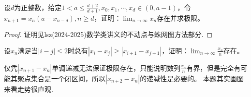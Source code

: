 \documentclass[../../main.tex]{subfiles}%
\begin{document}
\begin{example}
设\(d\)为正整数，给定\(1 < a\leqslant \frac{d + 2}{d + 1},x_0,x_1,\cdots,x_d\in(0,a - 1)\)，令\(x_{n + 1}=x_n(a - x_{n - d}),n\geqslant  d\)，证明：\(\lim_{n\rightarrow\infty}x_n\)存在并求极限。
\end{example}
\begin{proof}

证明见lsz(2024-2025)数学类讲义的不动点与蛛网图方法部分.

\end{proof}



\begin{example}
设\(x_n\)满足当\(|i - j|\leqslant 2\)时总有\(|x_i - x_j|\geqslant |x_{i + 1}-x_{j + 1}|\)，证明：\(\lim_{n\rightarrow\infty}\frac{x_n}{n}\)存在。
\end{example}
\begin{remark}
仅凭\(|x_{n + 1}-x_n|\)单调递减无法保证极限存在，只能说明数列\(\frac{x_n}{n}\)有界，但是完全有可能其聚点集合是一个闭区间，所以\(|x_{n + 2}-x_n|\)的递减性是必要的。
本题其实画图来看走势很直观.
\end{remark}
\end{document}
